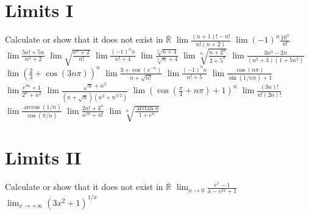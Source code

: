 \documentclass[10pt]{article}
\begin{document}
\section{Limits I}
\begin{ExerciseList}
    \Exercise Calculate or show that it does not exist in $\overline{\mathbb R}$
    \Question $\lim \frac{(n+1)!-n!}{n!(n+2)}$
    \Question $\lim (-1)^n \frac{10^n}{n!}$
    \Question $\lim \frac{5n!+5n}{n^n + 2}$
    \Question $\lim \sqrt{\frac{e^n+2}{n!}}$
    \Question $\lim \frac{(-1)^n n}{n!+4}$
    \Question $\lim \frac{\sqrt[3]{n+4}}{\sqrt[3]{n}+4}$
    \Question $\lim \sqrt[n]{\frac{n+2^n}{2+5^n}}$
    \Question $\lim \frac{3n^4-2n}{(n^2 + 3)(1+5n^2)}$
    \Question $\lim (\frac{2}{3}+\cos(3n\pi))^n$
    \Question $\lim \frac{3+\cos(e^{-n})}{n+\sqrt{n!}}$
    \Question $\lim \frac{(-1)^n n }{n! + 5}$
    \Question $\lim \frac{\cos{(n\pi)}}{\sin{(1/n\pi)}+1}$
    \Question $\lim \frac{e^{3n}+1}{2^n+n^2}$
    \Question $\lim \frac{\sqrt{n} + n^3}{(n+\sqrt{n})(n^2 + n^{3/2})}$
    \Question $\lim (\cos{(\frac{\pi}{4}+n\pi)}+1)^n$
    \Question $\lim \frac{(3n)!}{n!(2n)!}$
    \Question $\lim \frac{\arccos(1/n)}{\cos(\pi/n)}$
    \Question $\lim \frac{2n! + 3^n}{n^{50} + n!}$
    \Question $\lim \sqrt[n]{\frac{\arctan n}{1+e^n}}$
\end{ExerciseList}

\section{Limits II}
\begin{ExerciseList}
    \Exercise Calculate or show that it does not exist in $\overline{\mathbb R}$
    \Question $\lim_{x\to 0}\frac{e^x - 1}{x-e^{3x} + 1}$
    \Question $\lim_{x\to +\infty}(3x^2+1)^{1/x}$
\end{ExerciseList}
\end{document}
